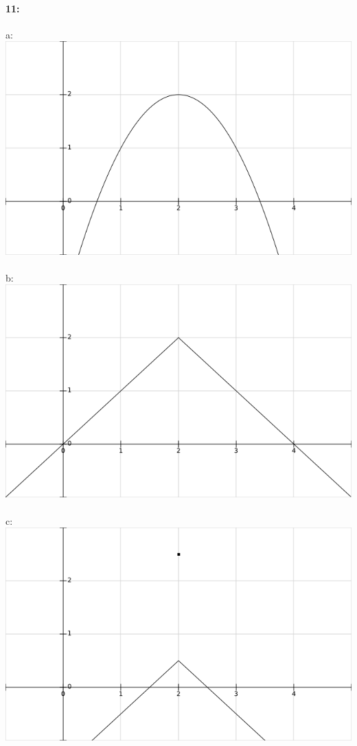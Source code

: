 \documentclass[12pt]{article}
\begin{document}
    \paragraph*{11:\\} 
        a:\\ \includegraphics[scale=.333]{graph11a.png}\\\\
        b:\\ \includegraphics[scale=.333]{graph11b.png}\\\\
        c:\\ \includegraphics[scale=.333]{graph11c.png}\\\\
\end{document}
